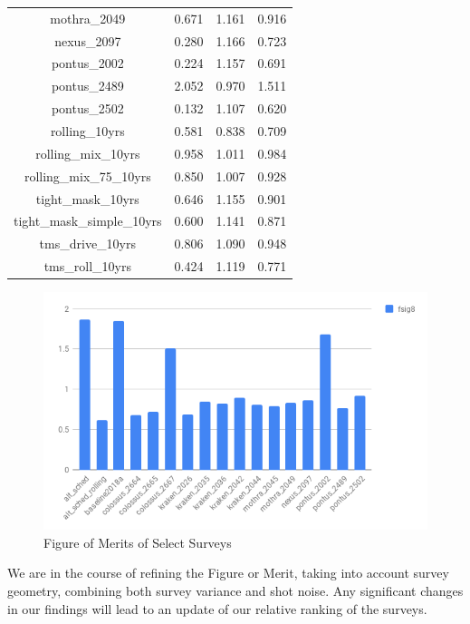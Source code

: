 \documentclass[a4paper,10pt]{article}
\begin{document}
\begin{table}
\begin{tabular}{|c|rrr|}
mothra\_2049  & 0.671 & 1.161 & 0.916  \\
nexus\_2097  & 0.280 & 1.166 & 0.723  \\
pontus\_2002  & 0.224 & 1.157 & 0.691  \\
pontus\_2489  & 2.052 & 0.970 & 1.511  \\
pontus\_2502  & 0.132 & 1.107 & 0.620  \\
rolling\_10yrs  & 0.581 & 0.838 & 0.709  \\
rolling\_mix\_10yrs  & 0.958 & 1.011 & 0.984  \\
rolling\_mix\_75\_10yrs  & 0.850 & 1.007 & 0.928  \\
tight\_mask\_10yrs  & 0.646 & 1.155 & 0.901  \\
tight\_mask\_simple\_10yrs  & 0.600 & 1.141 & 0.871  \\
tms\_drive\_10yrs  & 0.806 & 1.090 & 0.948  \\
tms\_roll\_10yrs  & 0.424 & 1.119 & 0.771  \\
\hline
\end{tabular}
\end{table}

\begin{figure}[htbp]
   \centering
   \includegraphics[scale=0.5]{chart.png} %
   \caption{Figure of Merits of Select Surveys}
   \label{fig:fom}
\end{figure}

We are in the course of refining the Figure or Merit, taking into account survey geometry, combining both survey variance and shot noise.
Any significant changes in our findings will lead to an update of our relative
ranking of the surveys.
\end{document}
